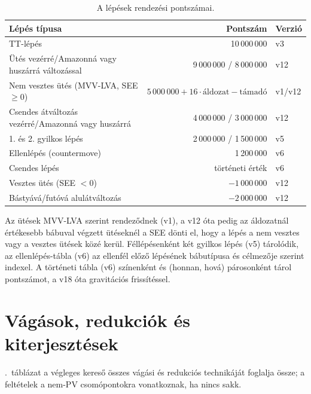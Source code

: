 \begin{table}[!ht]
	\footnotesize
	\centering
	\begin{tabular}{l r l}
		\toprule
		Lépés típusa & Pontszám & Verzió \\
		\midrule
		TT-lépés & 10\,000\,000 & v3 \\
		Ütés vezérré/Amazonná vagy huszárrá változással & 9\,000\,000 / 8\,000\,000 & v12 \\
		Nem vesztes ütés (MVV-LVA, SEE $\ge 0$) & $5\,000\,000 + 16\cdot\text{áldozat} - \text{támadó}$ & v1/v12 \\
		Csendes átváltozás vezérré/Amazonná vagy huszárrá & 4\,000\,000 / 3\,000\,000 & v12 \\
		1. és 2. gyilkos lépés & 2\,000\,000 / 1\,500\,000 & v5 \\
		Ellenlépés (countermove) & 1\,200\,000 & v6 \\
		Csendes lépés & történeti érték & v6 \\
		Vesztes ütés (SEE $<0$) & $-1\,000\,000$ & v12 \\
		Bástyává/futóvá alulátváltozás & $-2\,000\,000$ & v12 \\
		\bottomrule
	\end{tabular}
	\caption{A lépések rendezési pontszámai.}
	\label{tab:ordering}
\end{table}

Az ütések MVV-LVA szerint rendeződnek (v1), a v12 óta pedig az áldozatnál értékesebb bábuval végzett ütéseknél a SEE dönti el, hogy a lépés a nem vesztes vagy a vesztes ütések közé kerül. Féllépésenként két gyilkos lépés (v5) tárolódik, az ellenlépés-tábla (v6) az ellenfél előző lépésének bábutípusa és célmezője szerint indexel. A történeti tábla (v6) színenként és (honnan, hová) párosonként tárol pontszámot, a v18 óta gravitációs frissítéssel.

\section{Vágások, redukciók és kiterjesztések}

.~táblázat a végleges kereső összes vágási és redukciós technikáját foglalja össze; a feltételek a nem-PV csomópontokra vonatkoznak, ha nincs sakk.


